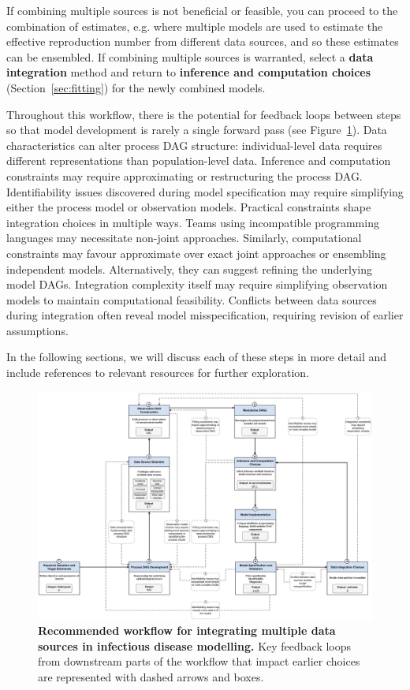\documentclass{article}
\begin{document}
If combining multiple sources is not beneficial or feasible, you can proceed to the combination of estimates, e.g. where multiple models are used to estimate the effective reproduction number from different data sources, and so these estimates can be ensembled.
If combining multiple sources is warranted, select a \textbf{data integration} method and return to \textbf{inference and computation choices} (Section~\ref{sec:fitting}) for the newly combined models.

Throughout this workflow, there is the potential for feedback loops between steps so that model development is rarely a single forward pass (see Figure~\ref{fig:workflow}). 
Data characteristics can alter process DAG structure: individual-level data requires different representations than population-level data. 
Inference and computation constraints may require approximating or restructuring the process DAG.
Identifiability issues discovered during model specification may require simplifying either the process model or observation models. 
Practical constraints shape integration choices in multiple ways. 
Teams using incompatible programming languages may necessitate non-joint approaches. 
Similarly, computational constraints may favour approximate over exact joint approaches or ensembling independent models.
Alternatively, they can suggest refining the underlying model DAGs.
Integration complexity itself may require simplifying observation models to maintain computational feasibility. 
Conflicts between data sources during integration often reveal model misspecification, requiring revision of earlier assumptions.

In the following sections, we will discuss each of these steps in more detail and include references to relevant resources for further exploration.

\begin{landscape}
\begin{figure}[htbp]
    \centering
    \includegraphics[width=\textwidth]{figures/restructured_workflow.drawio.pdf}
    \caption{\textbf{Recommended workflow for integrating multiple data sources in infectious disease modelling.} Key feedback loops from downstream parts of the workflow that impact earlier choices are represented with dashed arrows and boxes.}
    \label{fig:workflow}
\end{figure}
\end{landscape}
\end{document}
